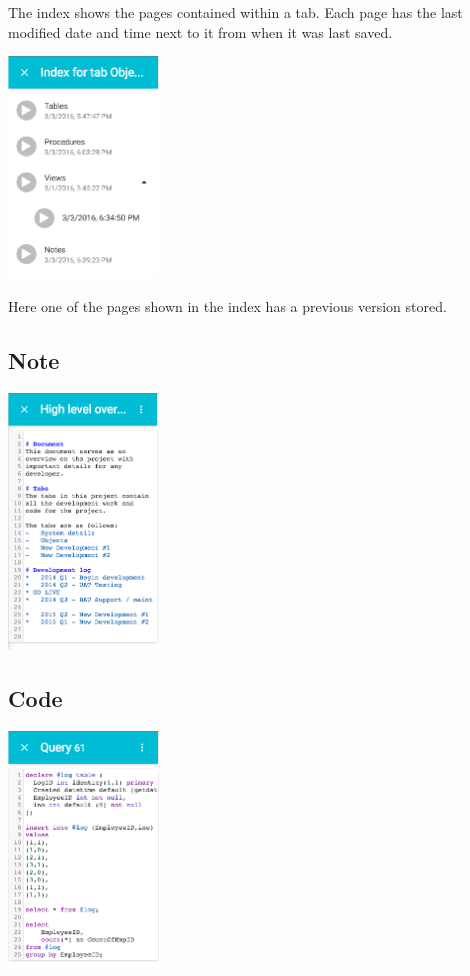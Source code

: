   The index shows the pages contained within a tab. Each page has the last
  modified date and time next to it from when it was last saved.  

  \begin{center}
  \includegraphics[width=0.3\textwidth]{Figures/Pages-Index2.png}
  \end{center}

  Here one of the pages shown in the index has a previous version stored.

\subsection{Note}

  \begin{center}
  \includegraphics[width=0.3\textwidth]{Figures/Pages-Note.png}
  \end{center}

\subsection{Code}

  \begin{center}
  \includegraphics[width=0.3\textwidth]{Figures/Pages-Code.png}
  \end{center}

